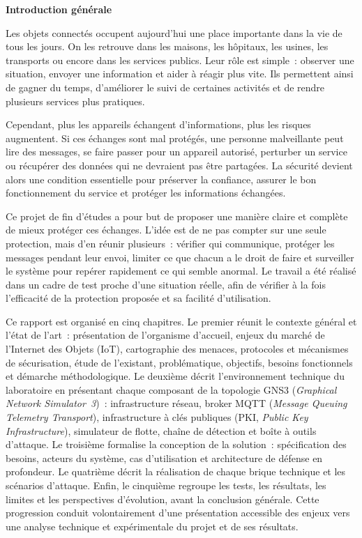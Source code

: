 {}
\begin{center}
{\Large\bfseries Introduction générale}
\end{center}
\vspace{0.4cm}

Les objets connectés occupent aujourd'hui une place importante dans la vie de tous les jours. On les retrouve dans les maisons, les hôpitaux, les usines, les transports ou encore dans les services publics. Leur rôle est simple~: observer une situation, envoyer une information et aider à réagir plus vite. Ils permettent ainsi de gagner du temps, d'améliorer le suivi de certaines activités et de rendre plusieurs services plus pratiques.

Cependant, plus les appareils échangent d'informations, plus les risques augmentent. Si ces échanges sont mal protégés, une personne malveillante peut lire des messages, se faire passer pour un appareil autorisé, perturber un service ou récupérer des données qui ne devraient pas être partagées. La sécurité devient alors une condition essentielle pour préserver la confiance, assurer le bon fonctionnement du service et protéger les informations échangées.

Ce projet de fin d'études a pour but de proposer une manière claire et complète de mieux protéger ces échanges. L'idée est de ne pas compter sur une seule protection, mais d'en réunir plusieurs~: vérifier qui communique, protéger les messages pendant leur envoi, limiter ce que chacun a le droit de faire et surveiller le système pour repérer rapidement ce qui semble anormal. Le travail a été réalisé dans un cadre de test proche d'une situation réelle, afin de vérifier à la fois l'efficacité de la protection proposée et sa facilité d'utilisation.

Ce rapport est organisé en cinq chapitres. Le premier réunit le contexte général et l'état de l'art~: présentation de l'organisme d'accueil, enjeux du marché de l'Internet des Objets (IoT), cartographie des menaces, protocoles et mécanismes de sécurisation, étude de l'existant, problématique, objectifs, besoins fonctionnels et démarche méthodologique. Le deuxième décrit l'environnement technique du laboratoire en présentant chaque composant de la topologie GNS3 (\emph{Graphical Network Simulator~3})~: infrastructure réseau, broker MQTT (\emph{Message Queuing Telemetry Transport}), infrastructure à clés publiques (PKI, \emph{Public Key Infrastructure}), simulateur de flotte, chaîne de détection et boîte à outils d'attaque. Le troisième formalise la conception de la solution~: spécification des besoins, acteurs du système, cas d'utilisation et architecture de défense en profondeur. Le quatrième décrit la réalisation de chaque brique technique et les scénarios d'attaque. Enfin, le cinquième regroupe les tests, les résultats, les limites et les perspectives d'évolution, avant la conclusion générale. Cette progression conduit volontairement d'une présentation accessible des enjeux vers une analyse technique et expérimentale du projet et de ses résultats.
